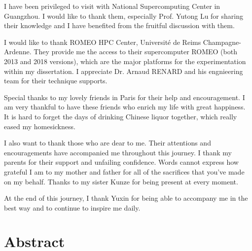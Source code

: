 \documentclass{xinzhewu}
\begin{document}
I have been privileged to visit with National Supercomputing Center in Guangzhou. I would like to thank them, especially Prof. Yutong Lu for sharing their knowledge and I have benefited from the fruitful discussion with them.

I would like to thank ROMEO HPC Center, Universit\'e de Reims Champagne-Ardenne. They provide me the access to their supercomputer ROMEO (both 2013 and 2018 versions), which are the major platforms for the experimentation within my dissertation. I appreciate Dr. Arnaud RENARD and his engnieering team for their technique supports.

Special thanks to my lovely friends in Paris for their help and encouragement. I am very thankful to have these friends who enrich my life with great happiness. It is hard to forget the days of drinking Chinese liquor together, which really eased my homesickness.

I also want to thank those who are dear to me. Their attentions and encouragements have accompanied me throughout this journey. I thank my parents for their support and unfailing confidence. Words cannot express how grateful I am to my mother and father for all of the sacrifices that you’ve made on my behalf. Thanks to my sister Kunze for being present at every moment.
	
At the end of this journey, I thank Yuxin for being able to accompany me in the best way and to continue to inspire me daily.


\clearemptydoublepage

\chapter*{Abstract}
\thispagestyle{empty}

\iffalse
An important application of supercomputers is to solve large-scale linear systems and eigenvalue problems by iterative methods. As the number of cores and heterogeneity of supercomputers increases, time spent in communication will be important comparing with the computation time, hence applications can be seen as a combination of distributed and parallel computing. Effectively solving these problems by iterative methods on large-scale platforms requires multi-levels of parallelism, and can minimize global communication, reduce synchronization, and facilitate asynchronous communication. In this thesis, we develop a distributed and parallel multi-level programming paradigm for iterative methods on High-Performance Computing (HPC) clusters. An implementation of a manager engine and runtime can handle the traffic, fault tolerance, and reusability of this paradigm on homogeneous and heterogeneous clusters. Finally, an example of iterative methods is developed based on this paradigm to simultaneously solve linear systems with multiple Right-hand sides (RHSs). Experiments on supercomputers have demonstrated that the implementation achieves better numerical and parallel performance than conventional methods.
\fi
\end{document}
